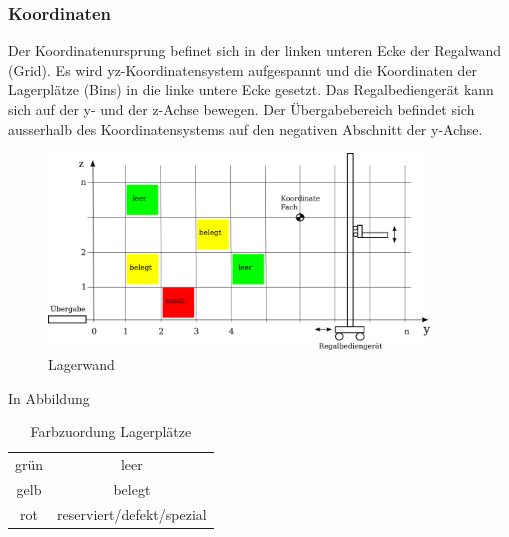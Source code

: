\subsubsection{Koordinaten}
Der Koordinatenursprung befinet sich in der linken unteren Ecke der Regalwand (Grid). Es wird yz-Koordinatensystem aufgespannt und die Koordinaten der Lagerplätze (Bins) in die linke untere Ecke gesetzt. Das Regalbediengerät kann sich auf der y- und der z-Achse bewegen. Der Übergabebereich befindet sich ausserhalb des Koordinatensystems auf den negativen Abschnitt der y-Achse. 
%
\begin{figure}[h]
  \begin{center}
    \includegraphics[width=0.9\textwidth]{images/koordinaten-wand.png}
    \caption{Lagerwand}
    \label{fig:wand}
  \end{center}
\end{figure}
%
In Abbildung %
%
\begin{table}
  \caption{Farbzuordung Lagerplätze}
  \label{tab:bin-color}

  \begin{center}
    \begin{tabular}{cc}
       grün & leer\\
       gelb & belegt\\
       rot & reserviert/defekt/spezial \\
    \end{tabular}
  \end{center}
\end{table}

%
